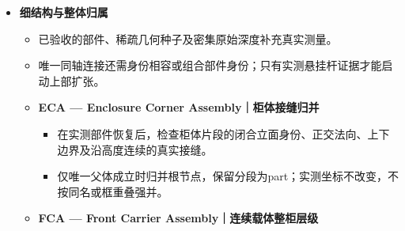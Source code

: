 \documentclass[UTF8,fontset=fandol]{ctexart}
\begin{document}
\begin{itemize}
\begin{itemize}
\begin{itemize}
\begin{itemize}
\end{itemize}

\item \textbf{DSM — Depth Surface Maintenance｜密集实测维护}


\begin{itemize}
\item 逐像素真实深度、原生身份、平面和已有边界联合约束；三独立帧确认，不填造平面网格。

\end{itemize}

\item \textbf{OSL / ROS｜层架与房间外壳归属}


\begin{itemize}
\item OSL以多层支撑及面向相机的开放前侧分开架体与旁侧闭合面；仅有几何时保留原名称。


\item ROS识别最外层房间面，把重复贴合该面的根实例退回背景；其他物体点不移动。

\end{itemize}

\item 缓存身份种子提出局部平面，封闭立面与稀疏开放格架分开；前后边界及逐点多视角验收恢复漏掉的真实表面。

\end{itemize}

\item \textbf{细结构与整体归属}


\begin{itemize}
\item 已验收的部件、稀疏几何种子及密集原始深度补充真实测量。


\item 唯一同轴连接还需身份相容或组合部件身份；只有实测悬挂杆证据才能启动上部扩张。


\item \textbf{ECA — Enclosure Corner Assembly｜柜体接缝归并}


\begin{itemize}
\item 在实测部件恢复后，检查柜体片段的闭合立面身份、正交法向、上下边界及沿高度连续的真实接缝。


\item 仅唯一父体成立时归并根节点，保留分段为part；实测坐标不改变，不按同名或框重叠强并。

\end{itemize}

\item \textbf{FCA — Front Carrier Assembly｜连续载体整柜层级}



\end{itemize}
\end{itemize}
\end{itemize}
\end{document}
